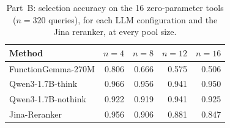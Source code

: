 \begin{table}[H]
\centering
\caption{Part~B: selection accuracy on the 16 zero-parameter tools ($n{=}320$ queries), for each LLM configuration and the Jina reranker, at every pool size.}
\label{tab:partB}
\begin{tabular}{lrrrr}
\toprule
Method & $n{=}4$ & $n{=}8$ & $n{=}12$ & $n{=}16$ \\
\midrule
FunctionGemma-270M & 0.806 & 0.666 & 0.575 & 0.506 \\
Qwen3-1.7B-think & 0.966 & 0.956 & 0.941 & 0.950 \\
Qwen3-1.7B-nothink & 0.922 & 0.919 & 0.941 & 0.925 \\
\midrule
Jina-Reranker & 0.956 & 0.906 & 0.881 & 0.847 \\
\bottomrule
\end{tabular}
\end{table}
